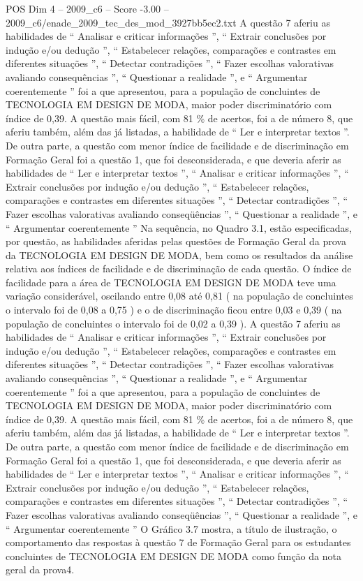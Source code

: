 \begin{textsample}{POS Dim 4 – 2009\_c6 – Score -3.00 – 2009\_c6/enade\_2009\_tec\_des\_mod\_3927bb5ec2.txt}
A questão 7 aferiu as habilidades de “ Analisar e criticar informações ”, “ Extrair conclusões por indução e/ou dedução ”, “ Estabelecer relações, comparações e contrastes em diferentes situações ”, “ Detectar contradições ”, “ Fazer escolhas valorativas avaliando consequências ”, “ Questionar a realidade ”, e “ Argumentar coerentemente ” foi a que apresentou, para a população de concluintes de TECNOLOGIA EM DESIGN DE MODA, maior poder discriminatório com índice de 0,39.
A questão mais fácil, com 81 \% de acertos, foi a de número 8, que aferiu também, além das já listadas, a habilidade de “ Ler e interpretar textos ”.
De outra parte, a questão com menor índice de facilidade e de discriminação em Formação Geral foi a questão 1, que foi desconsiderada, e que deveria aferir as habilidades de “ Ler e interpretar textos ”, “ Analisar e criticar informações ”, “ Extrair conclusões por indução e/ou dedução ”, “ Estabelecer relações, comparações e contrastes em diferentes situações ”, “ Detectar contradições ”, “ Fazer escolhas valorativas avaliando conseqüências ”, “ Questionar a realidade ”, e “ Argumentar coerentemente ” Na sequência, no Quadro 3.1, estão especificadas, por questão, as habilidades aferidas pelas questões de Formação Geral da prova da TECNOLOGIA EM DESIGN DE MODA, bem como os resultados da análise relativa aos índices de facilidade e de discriminação de cada questão.
O índice de facilidade para a área de TECNOLOGIA EM DESIGN DE MODA teve uma variação considerável, oscilando entre 0,08 até 0,81 ( na população de concluintes o intervalo foi de 0,08 a 0,75 ) e o de discriminação ficou entre 0,03 e 0,39 ( na população de concluintes o intervalo foi de 0,02 a 0,39 ).
A questão 7 aferiu as habilidades de “ Analisar e criticar informações ”, “ Extrair conclusões por indução e/ou dedução ”, “ Estabelecer relações, comparações e contrastes em diferentes situações ”, “ Detectar contradições ”, “ Fazer escolhas valorativas avaliando consequências ”, “ Questionar a realidade ”, e “ Argumentar coerentemente ” foi a que apresentou, para a população de concluintes de TECNOLOGIA EM DESIGN DE MODA, maior poder discriminatório com índice de 0,39.
A questão mais fácil, com 81 \% de acertos, foi a de número 8, que aferiu também, além das já listadas, a habilidade de “ Ler e interpretar textos ”.
De outra parte, a questão com menor índice de facilidade e de discriminação em Formação Geral foi a questão 1, que foi desconsiderada, e que deveria aferir as habilidades de “ Ler e interpretar textos ”, “ Analisar e criticar informações ”, “ Extrair conclusões por indução e/ou dedução ”, “ Estabelecer relações, comparações e contrastes em diferentes situações ”, “ Detectar contradições ”, “ Fazer escolhas valorativas avaliando conseqüências ”, “ Questionar a realidade ”, e “ Argumentar coerentemente ” O Gráfico 3.7 mostra, a título de ilustração, o comportamento das respostas à questão 7 de Formação Geral para os estudantes concluintes de TECNOLOGIA EM DESIGN DE MODA como função da nota geral da prova4.

\end{textsample}

